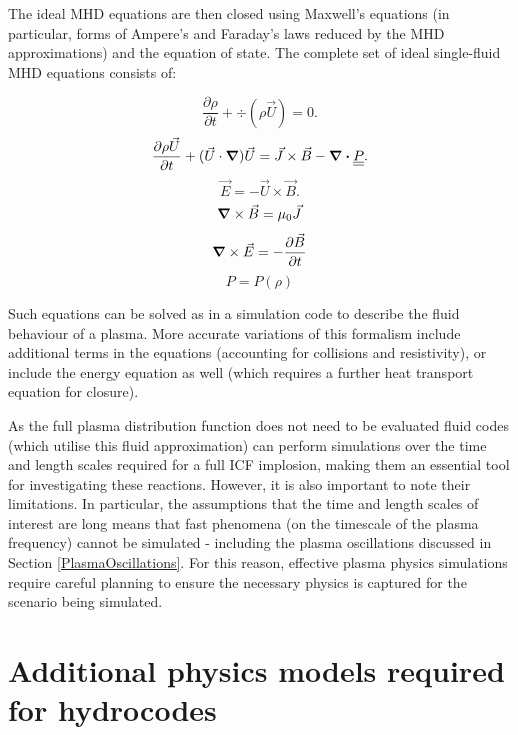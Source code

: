 The ideal MHD equations are then closed using Maxwell's equations (in particular, forms of Ampere's and Faraday's laws reduced by the MHD approximations) and the equation of state. The complete set of ideal single-fluid MHD equations consists of:

\begin{equation} \frac{\partial \rho}{\partial t} + \div (\rho \vec{U}) = 0. \end{equation}
\begin{equation} \frac{\partial \rho \vec{U}}{\partial t} + (\vec{U} \cdot \grad)\vec{U} =\vec{J} \times \vec{B} - \div \underline{\underline{P}} .\end{equation}
\begin{equation} \vec{E} = -\vec{U}\times\vec{B} . \end{equation}
\begin{equation} \grad \times \vec{B} = \mu_0 \vec{J} \end{equation}
\begin{equation} \grad \times \vec{E} = - \frac{\partial \vec{B}}{\partial t} \end{equation}
\begin{equation} P = P(\rho)  \end{equation}

Such equations can be solved as in a simulation code to describe the fluid behaviour of a plasma. More accurate variations of this formalism include additional terms in the equations (accounting for collisions and resistivity), or include the energy equation as well (which requires a further heat transport equation for closure). 

As the full plasma distribution function does not need to be evaluated fluid codes (which utilise this fluid approximation) can perform simulations over the time and length scales required for a full ICF implosion, making them an essential tool for investigating these reactions. However, it is also important to note their limitations. In particular, the assumptions that the time and length scales of interest are long means that fast phenomena (on the timescale of the plasma frequency) cannot be simulated - including the plasma oscillations discussed in Section \ref{PlasmaOscillations}. For this reason, effective plasma physics simulations require careful planning to ensure the necessary physics is captured for the scenario being simulated.



\section{Additional physics models required for hydrocodes}

